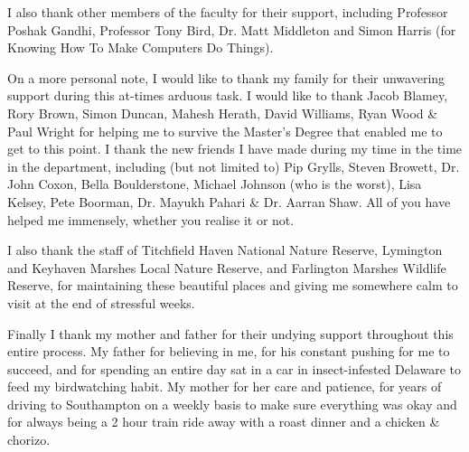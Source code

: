 \par I also thank other members of the faculty for their support, including Professor Poshak Gandhi, Professor Tony Bird, Dr. Matt Middleton and Simon Harris (for Knowing How To Make Computers Do Things).
\par On a more personal note, I would like to thank my family for their unwavering support during this at-times arduous task.  I would like to thank Jacob Blamey, Rory Brown, Simon Duncan, Mahesh Herath, David Williams, Ryan Wood \& Paul Wright for helping me to survive the Master's Degree that enabled me to get to this point.  I thank the new friends I have made during my time in the time in the department, including (but not limited to) Pip Grylls, Steven Browett, Dr. John Coxon, Bella Boulderstone, Michael Johnson (who is the worst), Lisa Kelsey, Pete Boorman, Dr. Mayukh Pahari \& Dr. Aarran Shaw.  All of you have helped me immensely, whether you realise it or not.
\par I also thank the staff of Titchfield Haven National Nature Reserve, Lymington and Keyhaven Marshes Local Nature Reserve, and Farlington Marshes Wildlife Reserve, for maintaining these beautiful places and giving me somewhere calm to visit at the end of stressful weeks.
\par Finally I thank my mother and father for their undying support throughout this entire process.  My father for believing in me, for his constant pushing for me to succeed, and for spending an entire day sat in a car in insect-infested Delaware to feed my birdwatching habit.  My mother for her care and patience, for years of driving to Southampton on a weekly basis to make sure everything was okay and for always being a 2 hour train ride away with a roast dinner and a chicken \& chorizo.